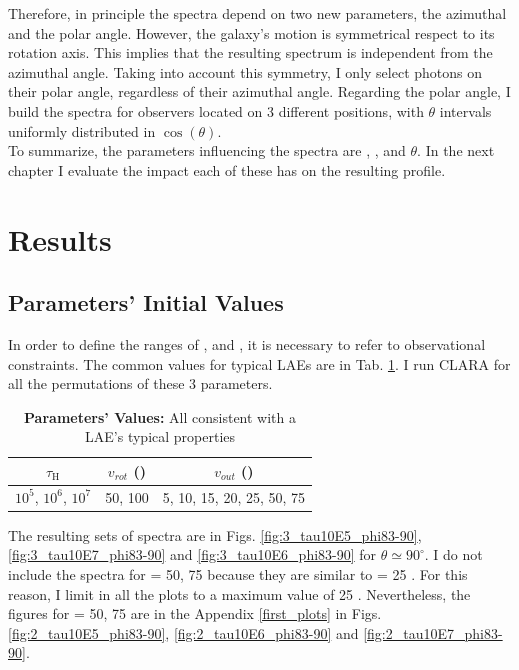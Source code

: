 \documentclass{latex/emulateapj}
\begin{document}
Therefore, in principle the spectra depend on two new parameters, the azimuthal and the polar angle. However, the galaxy's motion is symmetrical respect to its rotation axis. This implies that the resulting spectrum is independent from the azimuthal angle. Taking into account this symmetry, I only select photons on their polar angle, regardless of their azimuthal angle. Regarding the polar angle, I build the spectra for observers located on 3 different positions, with $\theta$ intervals uniformly distributed in $\cos(\theta)$. \\ 

To summarize, the parameters influencing the spectra are \vrot, \vout, \tauh and $\theta$. In the next chapter I evaluate the impact each of these has on the resulting profile. \\


\section{Results}
\label{sec:results}

\subsection{Parameters' Initial Values}

In order to define the ranges of \tauh, \vrot and \vout, it is necessary to refer to observational constraints. The common values for typical LAEs are in Tab. \ref{tab:values}. I run CLARA for all the permutations of these 3 parameters. \\

\begin{table}[htbp]
	\centering
	\begin{tabular}{|c|c|c|}
		\hline
		$\tau_{\mathrm{H}}$ & $v_{rot}$ (\kms) & $v_{out}$ (\kms) \\
		\hline
		$10^5$, $10^6$, $10^7$ & 50, 100 & 5, 10, 15, 20, 25, 50, 75 \\
		\hline
	\end{tabular}
	\caption{\textbf{Parameters' Values:} All consistent with a LAE's typical properties}
	\label{tab:values}
\end{table}

The resulting sets of spectra are in Figs. \ref{fig:3_tau10E5_phi83-90}, \ref{fig:3_tau10E7_phi83-90} and \ref{fig:3_tau10E6_phi83-90} for $\theta \simeq 90^\circ$. I do not include the spectra for \vout = 50, 75 \kms because they are similar to \vout = 25 \kms. For this reason, I limit in all the plots \vout to a maximum value of 25 \kms. Nevertheless, the figures for \vout = 50, 75 \kms are in the Appendix \ref{first_plots} in Figs. \ref{fig:2_tau10E5_phi83-90}, \ref{fig:2_tau10E6_phi83-90} and \ref{fig:2_tau10E7_phi83-90}.\\
\end{document}
